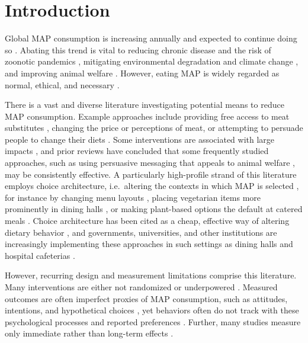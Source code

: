 \documentclass[sn-nature,referee,pdflatex]{sn-jnl}
\begin{document}



\maketitle

\section{Introduction}\label{sec1}

Global MAP consumption is increasing annually \citep{godfray2018} and
expected to continue doing so \citep{whitton2021}. Abating this trend is
vital to reducing chronic disease and the risk of zoonotic pandemics
\citep{willett2019, landry2023, hafez2020}, mitigating environmental
degradation and climate change
\citep{poore2018, koneswaran2008, greger2010}, and improving animal
welfare \citep{kuruc2023, scherer2019}. However, eating MAP is widely
regarded as normal, ethical, and necessary
\citep{piazza2022, milford2019}.

There is a vast and diverse literature investigating potential means to
reduce MAP consumption. Example approaches include providing free access
to meat substitutes \citep{katare2023}, changing the price
\citep{horgen2002} or perceptions \citep{kunst2016} of meat, or
attempting to persuade people to change their diets
\citep{bianchi2018conscious}. Some interventions are associated with
large impacts \citep{lentz2020, boronowsky2022, reinders2017}, and prior
reviews have concluded that some frequently studied approaches, such as
using persuasive messaging that appeals to animal welfare
\citep{mathur2021meta}, may be consistently effective. A particularly
high-profile strand of this literature employs choice architecture,
i.e.~altering the contexts in which MAP is selected
\citep{bianchi2018restructuring}, for instance by changing menu layouts
\citep{bacon2018, gravert2021}, placing vegetarian items more
prominently in dining halls \citep{ginn2024}, or making plant-based
options the default at catered meals \citep{hansen2021}. Choice
architecture has been cited as a cheap, effective way of altering
dietary behavior \citep{colgan2024}, and governments, universities, and
other institutions are increasingly implementing these approaches in
such settings as dining halls \citep{pollicino2024} and hospital
cafeterias \citep{morgenstern2024}.

However, recurring design and measurement limitations comprise this
literature. Many interventions are either not randomized
\citep{garnett2020} or underpowered \citep{delichatsios2001}. Measured
outcomes are often imperfect proxies of MAP consumption, such as
attitudes, intentions, and hypothetical choices
\citep{raghoebar2020, vermeer2010}, yet behaviors often do not track
with these psychological processes
\citep{mathur2021effectiveness, porat2024} and reported preferences
\citep{hensher2010}. Further, many studies measure only immediate rather
than long-term effects \citep{hansen2021, griesoph2021}.
\end{document}
